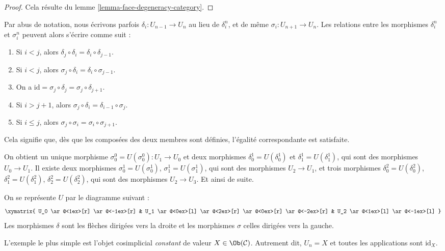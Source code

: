 \begin{proof}
Cela résulte du lemme \ref{lemma-face-degeneracy-category}.
\end{proof}

\begin{remark}
\label{remark-relations-cosimplicial}
Par abus de notation, nous écrivons parfois
$\delta_i : U_{n - 1} \to U_n$ au lieu de $\delta^n_i$, et de même
$\sigma_i : U_{n + 1} \to U_n$. Les relations entre les morphismes
$\delta^n_i$ et $\sigma^n_i$ peuvent alors s'écrire comme suit :
\begin{enumerate}
\item Si $i < j$, alors
$\delta_j \circ \delta_i = \delta_i \circ \delta_{j - 1}$.
\item Si $i < j$, alors
$\sigma_j \circ \delta_i = \delta_i \circ \sigma_{j - 1}$.
\item On a
$\text{id} = \sigma_j \circ \delta_j = \sigma_j \circ \delta_{j + 1}$.
\item Si $i > j + 1$, alors
$\sigma_j \circ \delta_i = \delta_{i - 1} \circ \sigma_j$.
\item Si $i \leq j$, alors
$\sigma_j \circ \sigma_i = \sigma_i \circ \sigma_{j + 1}$.
\end{enumerate}
Cela signifie que, dès que les composées des deux membres sont définies,
l'égalité correspondante est satisfaite.
\end{remark}

\noindent
On obtient un unique morphisme
$\sigma^0_0 = U(\sigma^0_0) : U_1 \to U_0$ et deux morphismes
$\delta^1_0 = U(\delta^1_0)$ et $\delta^1_1 = U(\delta^1_1)$,
qui sont des morphismes $U_0 \to U_1$. Il existe deux morphismes
$\sigma^1_0 = U(\sigma^1_0)$, $\sigma^1_1 = U(\sigma^1_1)$,
qui sont des morphismes $U_2 \to U_1$, et trois morphismes
$\delta^2_0 = U(\delta^2_0)$, $\delta^2_1 = U(\delta^2_1)$,
$\delta^2_2 = U(\delta^2_2)$, qui sont des morphismes $U_2 \to U_3$.
Et ainsi de suite.

\medskip\noindent
On se représente $U$ par le diagramme suivant :
$$
\xymatrix{
U_0
\ar@<1ex>[r]
\ar@<-1ex>[r]
&
U_1
\ar@<0ex>[l]
\ar@<2ex>[r]
\ar@<0ex>[r]
\ar@<-2ex>[r]
&
U_2
\ar@<1ex>[l]
\ar@<-1ex>[l]
}
$$
Les morphismes $\delta$ sont les flèches dirigées vers la droite et les
morphismes $\sigma$ celles dirigées vers la gauche.

\begin{example}
\label{example-constant-cosimplicial-object}
L'exemple le plus simple est l'objet cosimplicial {\it constant} de valeur
$X \in \Ob(\mathcal{C})$. Autrement dit, $U_n = X$ et toutes les
applications sont $\text{id}_X$.
\end{example}


